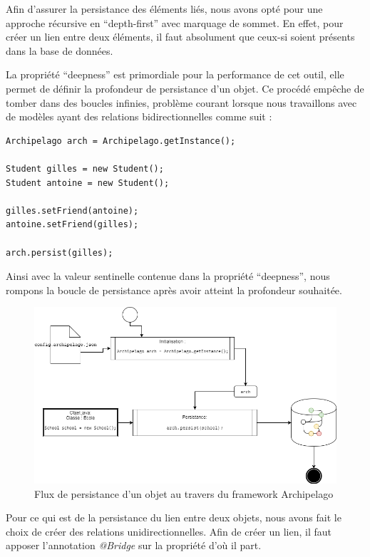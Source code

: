 \documentclass[a4paper,fleqn,12pt]{report}
\begin{document}
Afin d'assurer la persistance des éléments liés, nous avons opté pour une approche récursive en \enquote{depth-first} avec marquage de sommet. En effet, pour créer un lien entre deux éléments, il faut absolument que ceux-si soient présents dans la base de données.

La propriété \enquote{deepness} est primordiale pour la performance de cet outil, elle permet de définir la profondeur de persistance d'un objet. Ce procédé empêche de tomber dans des boucles infinies, problème courant lorsque nous travaillons avec de modèles ayant des relations bidirectionnelles comme suit : 

\begin{lstlisting}
Archipelago arch = Archipelago.getInstance();

Student gilles = new Student();
Student antoine = new Student();

gilles.setFriend(antoine);
antoine.setFriend(gilles);

arch.persist(gilles);
\end{lstlisting}

Ainsi avec la valeur sentinelle contenue dans la propriété \enquote{deepness}, nous rompons la boucle de persistance après avoir atteint la profondeur souhaitée.

\begin{figure}[!h]
\centering
\includegraphics[scale=0.5]{figures/Persist.png}
\caption{Flux de persistance d'un objet au travers du framework Archipelago}
\label{fig:Persist}
\end{figure}
    
Pour ce qui est de la persistance du lien entre deux objets, nous avons fait le choix de créer des relations unidirectionnelles. Afin de créer un lien, il faut apposer l'annotation \textit{@Bridge} sur la propriété d'où il part.
\end{document}
